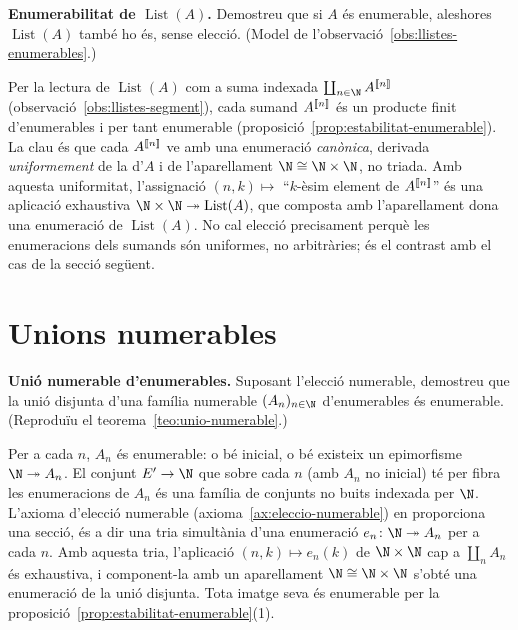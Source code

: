 \begin{exercici}
\textbf{Enumerabilitat de \(\operatorname{List}(A)\).} Demostreu que si \(A\) és enumerable, aleshores \(\operatorname{List}(A)\) també ho és, sense elecció. (Model de l'observació~\ref{obs:llistes-enumerables}.)
\end{exercici}
\begin{solucio}
Per la lectura de \(\operatorname{List}(A)\) com a suma indexada \(\coprod_{n\in\N}A^{\seg{n}}\) (observació~\ref{obs:llistes-segment}), cada sumand \(A^{\llbracket n\rrbracket}\) és un producte finit d'enumerables i per tant enumerable (proposició~\ref{prop:estabilitat-enumerable}). La clau és que cada \(A^{\llbracket n\rrbracket}\) ve amb una enumeració \emph{canònica}, derivada \emph{uniformement} de la d'\(A\) i de l'aparellament \(\N\cong\N\times\N\), no triada. Amb aquesta uniformitat, l'assignació \((n,k)\mapsto\) \enquote{\(k\)-èsim element de \(A^{\llbracket n\rrbracket}\)} és una aplicació exhaustiva \(\N\times\N\twoheadrightarrow\operatorname{List}(A)\), que composta amb l'aparellament dona una enumeració de \(\operatorname{List}(A)\). No cal elecció precisament perquè les enumeracions dels sumands són uniformes, no arbitràries; és el contrast amb el cas de la secció següent.
\end{solucio}

\section{Unions numerables}\label{prac:unions}

\begin{exercici}
\textbf{Unió numerable d'enumerables.} Suposant l'elecció numerable, demostreu que la unió disjunta d'una família numerable \((A_n)_{n\in\N}\) d'enumerables és enumerable. (Reproduïu el teorema~\ref{teo:unio-numerable}.)
\end{exercici}
\begin{solucio}
Per a cada \(n\), \(A_n\) és enumerable: o bé inicial, o bé existeix un epimorfisme \(\N\twoheadrightarrow A_n\). El conjunt \(E'\to\N\) que sobre cada \(n\) (amb \(A_n\) no inicial) té per fibra les enumeracions de \(A_n\) és una família de conjunts no buits indexada per \(\N\). L'axioma d'elecció numerable (axioma~\ref{ax:eleccio-numerable}) en proporciona una secció, és a dir una tria simultània d'una enumeració \(e_n\colon\N\twoheadrightarrow A_n\) per a cada \(n\). Amb aquesta tria, l'aplicació \((n,k)\mapsto e_n(k)\) de \(\N\times\N\) cap a \(\coprod_n A_n\) és exhaustiva, i component-la amb un aparellament \(\N\cong\N\times\N\) s'obté una enumeració de la unió disjunta. Tota imatge seva és enumerable per la proposició~\ref{prop:estabilitat-enumerable}(1).
\end{solucio}

